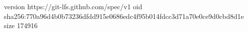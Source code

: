 version https://git-lfs.github.com/spec/v1
oid sha256:770a96d4b0b73236dfdd915e0686edc4f95b014fdcc3d71a70e0ce9d0cbd8d1e
size 174916

